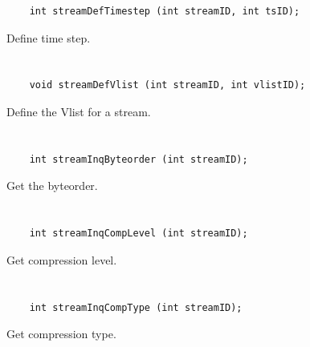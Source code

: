 \begin{verbatim}
    int streamDefTimestep (int streamID, int tsID);
\end{verbatim}

Define time step.


\section*{\tt {}}

\begin{verbatim}
    void streamDefVlist (int streamID, int vlistID);
\end{verbatim}

Define the Vlist for a stream.


\section*{\tt {}}

\begin{verbatim}
    int streamInqByteorder (int streamID);
\end{verbatim}

Get the byteorder.


\section*{\tt {}}

\begin{verbatim}
    int streamInqCompLevel (int streamID);
\end{verbatim}

Get compression level.


\section*{\tt {}}

\begin{verbatim}
    int streamInqCompType (int streamID);
\end{verbatim}

Get compression type.


\section*{\tt {}}

